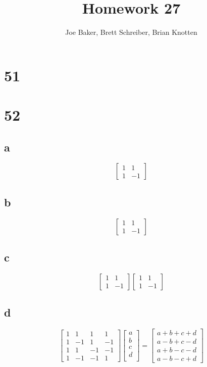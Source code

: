 \documentclass[letterpaper,notitlepage,twoside]{article}
\begin{document}
\title{Homework 27}
\author{Joe Baker, Brett Schreiber, Brian Knotten}
\maketitle

\section*{51}

\section*{52}
\subsection*{a}
\[
\begin{bmatrix}
1 &  1 \\
1 & -1
\end{bmatrix}
\]
\subsection*{b}
\[
\begin{bmatrix}
1 &  1 \\
1 & -1
\end{bmatrix}
\]
\subsection*{c}
\[
\begin{bmatrix}
1 &  1 \\
1 & -1
\end{bmatrix}
\begin{bmatrix}
1 &  1 \\
1 & -1
\end{bmatrix}
\]
\subsection*{d}
\[
\begin{bmatrix}
1 &  1 &  1 &  1 \\
1 & -1 &  1 & -1 \\
1 &  1 & -1 & -1 \\
1 & -1 & -1 &  1 
\end{bmatrix}
\begin{bmatrix}
a \\
b \\
c \\
d \\
\end{bmatrix}
=
\begin{bmatrix}
a + b + c + d \\
a - b + c - d \\
a + b - c - d \\
a - b - c + d
\end{bmatrix}
\]
\end{document}
